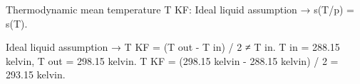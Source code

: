 Thermodynamic mean temperature T KF:  
Ideal liquid assumption → s(T/p) = s(T).  

Ideal liquid assumption → T KF = (T out - T in) / 2 ≠ T in.  
T in = 288.15 kelvin, T out = 298.15 kelvin.  
T KF = (298.15 kelvin - 288.15 kelvin) / 2 = 293.15 kelvin.
